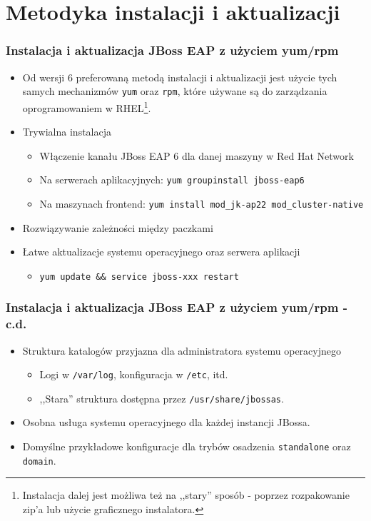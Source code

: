 \documentclass[dvipsnames,table]{beamer}
\begin{document}
\section{Metodyka instalacji i aktualizacji}

\begin{frame}
\frametitle{Instalacja i aktualizacja JBoss EAP z użyciem yum/rpm}
\begin{itemize}
	\item Od wersji 6 preferowaną metodą instalacji i aktualizacji jest użycie tych samych mechanizmów {\tt yum} oraz {\tt rpm}, które używane są do zarządzania oprogramowaniem w RHEL\footnote{Instalacja dalej jest możliwa też na ,,stary'' sposób - poprzez rozpakowanie zip'a lub użycie graficznego instalatora.}.
	\item Trywialna instalacja
	\begin{itemize}
		\item Włączenie kanału JBoss EAP 6 dla danej maszyny w Red Hat Network
		\item Na serwerach aplikacyjnych: {\tt yum groupinstall jboss-eap6}
		\item Na maszynach frontend: {\tt yum install mod\_jk-ap22 mod\_cluster-native}
	\end{itemize}
	\item Rozwiązywanie zależności między paczkami
	\item Łatwe aktualizacje systemu operacyjnego oraz serwera aplikacji
	\begin{itemize}
		\item {\tt yum update \&\& service jboss-xxx restart}
	\end{itemize}

\end{itemize}
\end{frame}

\begin{frame}
\frametitle{Instalacja i aktualizacja JBoss EAP z użyciem yum/rpm - c.d.}
\begin{itemize}
	\item Struktura katalogów przyjazna dla administratora systemu operacyjnego
	\begin{itemize}
		\item Logi w {\tt /var/log}, konfiguracja w {\tt /etc}, itd.
		\item ,,Stara'' struktura dostępna przez {\tt /usr/share/jbossas}.
	\end{itemize}
	\item Osobna usługa systemu operacyjnego dla każdej instancji JBossa.
	\item Domyślne przykładowe konfiguracje dla trybów osadzenia {\tt standalone} oraz {\tt domain}.
\end{itemize}
\end{frame}
\end{document}
